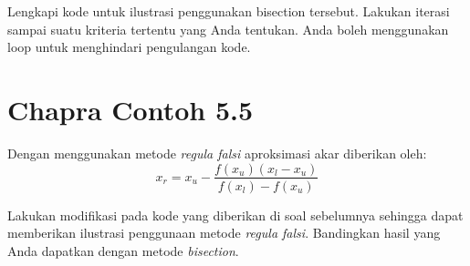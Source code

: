 \begin{soal}
Lengkapi kode untuk ilustrasi penggunakan bisection tersebut. Lakukan iterasi sampai
suatu kriteria tertentu yang Anda tentukan. Anda boleh menggunakan loop
untuk menghindari pengulangan kode.
\end{soal}

\section{Chapra Contoh 5.5}
Dengan menggunakan metode \textit{regula falsi} aproksimasi akar diberikan oleh:
\begin{equation}
x_{r} = x_{u} - \frac{f(x_u)(x_{l} - x_{u})}{f(x_l) - f(x_u)}
\end{equation}

\begin{soal}
Lakukan modifikasi pada kode yang diberikan di soal sebelumnya sehingga dapat
memberikan ilustrasi penggunaan metode \textit{regula falsi}. Bandingkan hasil yang
Anda dapatkan dengan metode \textit{bisection}.
\end{soal}
